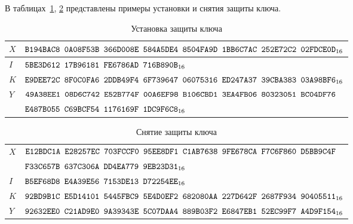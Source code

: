 \label{TEST.KWP}

В таблицах~\ref{Table.TEST.KeyWrap}, \ref{Table.TEST.KeyUnwrap} 
представлены примеры установки и снятия защиты ключа.

\begin{table}[H]
\caption{Установка защиты ключа}\label{Table.TEST.KeyWrap}
\begin{tabular}{|l|l|}
\hline
$X$ &
$\texttt{B194BAC8~0A08F53B~366D008E~584A5DE4~8504FA9D~1BB6C7AC~252E72C2~02FDCE0D}_{16}$\\
\hline
$I$ &
$\texttt{5BE3D612~17B96181~FE6786AD~716B890B}_{16}$\\
\hline
$K$ & 
$\texttt{E9DEE72C~8F0C0FA6~2DDB49F4~6F739647~06075316~ED247A37~39CBA383~03A98BF6}_{16}$\\
\dhline
$Y$ &
$\texttt{49A38EE1~08D6C742~E52B774F~00A6EF98~B106CBD1~3EA4FB06~80323051~BC04DF76}$\\
&
$\texttt{E487B055~C69BCF54~1176169F~1DC9F6C8}_{16}$\\
\hline
\end{tabular}
\end{table}

\begin{table}[H]
\caption{Снятие защиты ключа}\label{Table.TEST.KeyUnwrap}
\begin{tabular}{|l|l|}
\hline
$X$ &
$\texttt{E12BDC1A~E28257EC~703FCCF0~95EE8DF1~C1AB7638~9FE678CA~F7C6F860~D5BB9C4F}$\\
&
$\texttt{F33C657B~637C306A~DD4EA779~9EB23D31}_{16}$\\
\hline
$I$ & 
$\texttt{B5EF68D8~E4A39E56~7153DE13~D72254EE}_{16}$\\
\hline
$K$ & 
$\texttt{92BD9B1C~E5D14101~5445FBC9~5E4D0EF2~682080AA~227D642F~2687F934~90405511}_{16}$\\
\dhline
$Y$ &
$\texttt{92632EE0~C21AD9E0~9A39343E~5C07DAA4~889B03F2~E6847EB1~52EC99F7~A4D9F154}_{16}$\\
\hline
\end{tabular}
\end{table}


